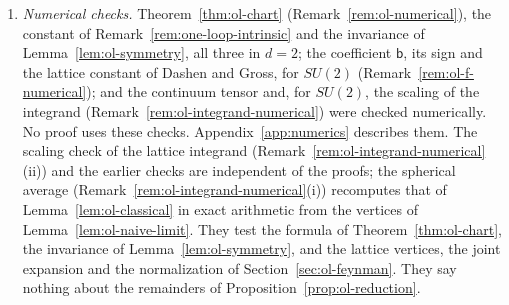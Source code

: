 \begin{remark}
\begin{enumerate}[label=(\alph*)]
\begin{itemize}
  \item \emph{The last steps.} For the last $m_1$ steps the lower half of the analogue of Ba\l aban's (0.31) holds only up to an additive constant (the paragraph after Theorem~\ref{thm:ol-uv}). The exact form would need the single coefficients $\beta_{j+1}$, $K-m_1\le j<K$, to be positive. A possible route, for $K$ large, is the convergence to $\beta_\infty$ of $\beta^{(1)}_{j+1}=c_{j+1}-c_j$, where $c_k$ is the coefficient of $T_{\Gamma^{(1)}_k}$ (Theorem~\ref{thm:ol-cumulative}). By Lemma~\ref{lem:ol-coarse-map} and Proposition~\ref{prop:ol-reduction}, $c_k$ is $\beta_{\rm F}$ at $\eta=L^{-k}$ plus the coefficient $r^{\rm fine}_k$ of the remainder $T_{\rm fine}-T_{\rm F}$, which is bounded uniformly in $k$. By Theorem~\ref{thm:ol-log}, $\beta_{\rm F}-k\beta_\infty$ converges as $k\to\infty$, so the differences of the first terms converge to $\beta_\infty$. What is missing is the convergence of $r^{\rm fine}_k$ as $k\to\infty$, a continuum limit at $U=1$ of explicit operators. In addition, the errors of (F2) and (F3) at the last steps must be small compared with $\beta_\infty$, which needs a lower bound on $n_K$ and a condition on $\gamma$. This is not carried out here.
  \item \emph{The large-field stage}, which is not treated (Remark~\ref{rem:sf-flow}(d)).
  \end{itemize}
\item \emph{Numerical checks.} Theorem~\ref{thm:ol-chart} (Remark~\ref{rem:ol-numerical}), the constant of Remark~\ref{rem:one-loop-intrinsic} and the invariance of Lemma~\ref{lem:ol-symmetry}, all three in $d=2$; the coefficient $\mathsf b$, its sign and the lattice constant of Dashen and Gross, for $SU(2)$ (Remark~\ref{rem:ol-f-numerical}); and the continuum tensor and, for $SU(2)$, the scaling of the integrand (Remark~\ref{rem:ol-integrand-numerical}) were checked numerically. No proof uses these checks. Appendix~\ref{app:numerics} describes them.
  The scaling check of the lattice integrand (Remark~\ref{rem:ol-integrand-numerical}(ii)) and the earlier checks are independent of the proofs; the spherical average (Remark~\ref{rem:ol-integrand-numerical}(i)) recomputes that of Lemma~\ref{lem:ol-classical} in exact arithmetic from the vertices of Lemma~\ref{lem:ol-naive-limit}. They test the formula of Theorem~\ref{thm:ol-chart}, the invariance of Lemma~\ref{lem:ol-symmetry}, and the lattice vertices, the joint expansion and the normalization of Section~\ref{sec:ol-feynman}. They say nothing about the remainders of Proposition~\ref{prop:ol-reduction}.
\end{enumerate}
\end{remark}
